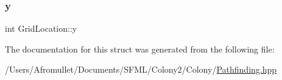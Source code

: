 \mbox{\label{struct_grid_location_aa73f11982d6425de33e1cd4a5a4c7ac6}} 
\subsubsection{\texorpdfstring{y}{y}}
{\footnotesize\ttfamily int Grid\+Location\+::y}



The documentation for this struct was generated from the following file\+:\begin{DoxyCompactItemize}
\item 
/\+Users/\+Afromullet/\+Documents/\+S\+F\+M\+L/\+Colony2/\+Colony/\mbox{\hyperlink{_pathfinding_8hpp}{Pathfinding.\+hpp}}\end{DoxyCompactItemize}
